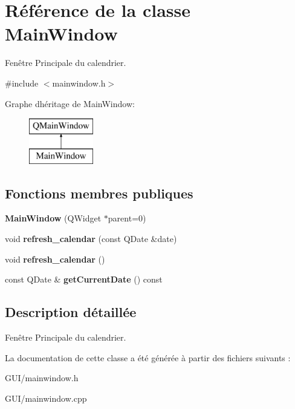 \hypertarget{class_main_window}{}\section{Référence de la classe Main\+Window}
\label{class_main_window}


Fenêtre Principale du calendrier.  




{\ttfamily \#include $<$mainwindow.\+h$>$}

Graphe d\textquotesingle{}héritage de Main\+Window\+:\begin{figure}[H]
\begin{center}
\leavevmode
\includegraphics[height=2.000000cm]{class_main_window}
\end{center}
\end{figure}
\subsection*{Fonctions membres publiques}
\begin{DoxyCompactItemize}
\item 
\hypertarget{class_main_window_a8b244be8b7b7db1b08de2a2acb9409db}{}{\bfseries Main\+Window} (Q\+Widget $\ast$parent=0)\label{class_main_window_a8b244be8b7b7db1b08de2a2acb9409db}

\item 
\hypertarget{class_main_window_ae29bd136b47fdb473f80ce007e079b0c}{}void {\bfseries refresh\+\_\+calendar} (const Q\+Date \&date)\label{class_main_window_ae29bd136b47fdb473f80ce007e079b0c}

\item 
\hypertarget{class_main_window_afbd226d0f42df6f1436114bd96ea4d7d}{}void {\bfseries refresh\+\_\+calendar} ()\label{class_main_window_afbd226d0f42df6f1436114bd96ea4d7d}

\item 
\hypertarget{class_main_window_aa9c7f49a5902ddc911a117d547781aa7}{}const Q\+Date \& {\bfseries get\+Current\+Date} () const \label{class_main_window_aa9c7f49a5902ddc911a117d547781aa7}

\end{DoxyCompactItemize}


\subsection{Description détaillée}
Fenêtre Principale du calendrier. 

La documentation de cette classe a été générée à partir des fichiers suivants \+:\begin{DoxyCompactItemize}
\item 
G\+U\+I/mainwindow.\+h\item 
G\+U\+I/mainwindow.\+cpp\end{DoxyCompactItemize}
